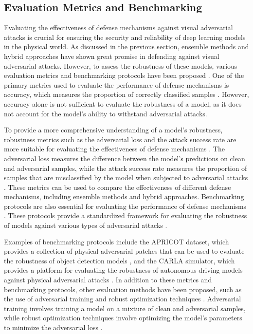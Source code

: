 \documentclass[11pt,a4paper]{article}
\begin{document}
\subsection{Evaluation Metrics and Benchmarking}


Evaluating the effectiveness of defense mechanisms against visual adversarial attacks is crucial for ensuring the security and reliability of deep learning models in the physical world. As discussed in the previous section, ensemble methods and hybrid approaches have shown great promise in defending against visual adversarial attacks. However, to assess the robustness of these models, various evaluation metrics and benchmarking protocols have been proposed \cite{arxiv:1712.07107}. One of the primary metrics used to evaluate the performance of defense mechanisms is accuracy, which measures the proportion of correctly classified samples \cite{doi:10.1016/j.eng.2019.12.012}. However, accuracy alone is not sufficient to evaluate the robustness of a model, as it does not account for the model's ability to withstand adversarial attacks.

To provide a more comprehensive understanding of a model's robustness, robustness metrics such as the adversarial loss and the attack success rate are more suitable for evaluating the effectiveness of defense mechanisms \cite{doi:10.1145/3274895.3274904}. The adversarial loss measures the difference between the model's predictions on clean and adversarial samples, while the attack success rate measures the proportion of samples that are misclassified by the model when subjected to adversarial attacks \cite{doi:10.1109/iros51168.2021.9636638}. These metrics can be used to compare the effectiveness of different defense mechanisms, including ensemble methods and hybrid approaches. Benchmarking protocols are also essential for evaluating the performance of defense mechanisms \cite{doi:10.1109/access.2018.2807385}. These protocols provide a standardized framework for evaluating the robustness of models against various types of adversarial attacks \cite{arxiv:1712.09665}.

Examples of benchmarking protocols include the APRICOT dataset, which provides a collection of physical adversarial patches that can be used to evaluate the robustness of object detection models \cite{doi:10.1007/978-3-030-58589-1_3}, and the CARLA simulator, which provides a platform for evaluating the robustness of autonomous driving models against physical adversarial attacks \cite{arxiv:2007.16118}. In addition to these metrics and benchmarking protocols, other evaluation methods have been proposed, such as the use of adversarial training and robust optimization techniques \cite{arxiv:2102.01356}. Adversarial training involves training a model on a mixture of clean and adversarial samples, while robust optimization techniques involve optimizing the model's parameters to minimize the adversarial loss \cite{doi:10.1609/aaai.v34i01.5443}.
\end{document}
